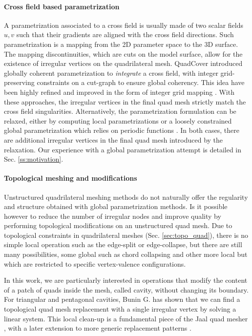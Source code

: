 \documentclass[AMA,STIX1COL]{WileyNJD-v2}
\newcommand\rsec[1]{Sec. \ref{#1}}
\begin{document}
{\paragraph{Cross field based parametrization} 
A parametrization associated to a cross field is usually made
of two scalar fields $u,v$ such that their gradients are aligned
with the cross field directions. Such parametrization is a mapping
from the 2D parameter space to the 3D surface.  The mapping discontinuities,
which are cuts on the model surface, allow for the existence of irregular
vertices on the quadrilateral mesh. QuadCover \cite{quadcover}
introduced globally coherent parametrization to \emph{integrate} a cross field,
with integer grid-preserving constraints on a cut-graph to ensure global
coherency. This idea have been highly refined and improved in the form of
integer grid mapping \cite{bommes2009,bommes2013,campen2015,qex}.
With these approaches, the irregular vertices in the final quad mesh strictly
match the cross field singularities. Alternatively, the parametrization 
formulation can be relaxed, either by
computing local parametrizations \cite{jakob2015} or a loosely constrained 
global
parametrization which relies on periodic functions \cite{Ray2006}. In both
cases, there are additional irregular vertices in the final quad mesh
introduced by the relaxation.
Our experience with a global parametrization attempt is detailed in
\rsec{ss:motivation}.


\paragraph{Topological meshing and modifications}
Unstructured quadrilateral meshing methods do not naturally offer
the regularity and structure obtained with global parametrization methods.
Is it possible however to reduce the number of irregular nodes and improve 
quality by performing topological modifications on an unstructured quad mesh.
Due to topological constraints in quadrilateral meshes (\rsec{sec:topo_quad}),
there is no simple local operation such as the edge-split or edge-collapse,
but there are still many possibilities, some global such as chord collapsing \cite{Daniels2008}
and other more local \cite{sanchez} but which are restricted to specific vertex-valence configurations. 

In this work, we are particularly interested in operations that modify the
content of a patch of quads inside the mesh, called cavity, without changing
its boundary.  For triangular and pentagonal cavities, Bunin G. \cite{bunin2008} has
shown that we can find a topological quad mesh replacement with a single
irregular vertex by solving a linear system. This local clean-up
is a fundamental piece of the Jaal quad mesher \cite{jaal}, with
a later extension to more generic replacement patterns \cite{verma2015}.

}
\end{document}
